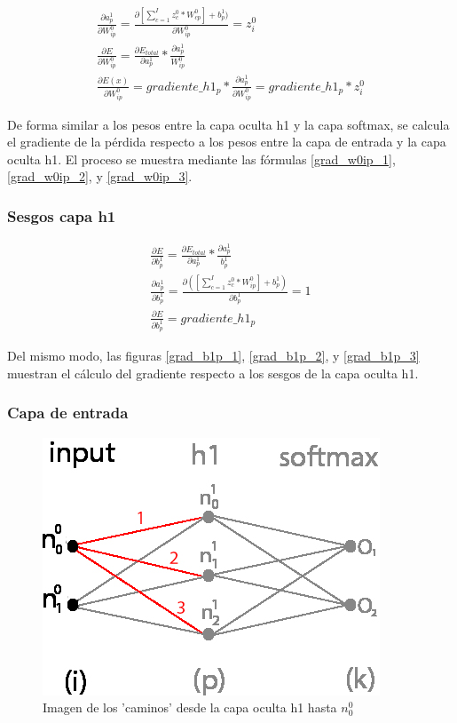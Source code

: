 \begin{gather}
	\frac{\partial a^1_p }{\partial W^0_{ip} } = \frac{\partial [\sum_{c=1}^{I} z^0_c * W^0_{cp}] + b^1_p)}{\partial W^0_{ip} } = z^0_i \label{grad_w0ip_1} \\
	\frac{\partial E}{\partial W^0_{ip}} = \frac{\partial E_{total} }{\partial a^1_p } * \frac{\partial a^1_p}{W^0_{ip}} \label{grad_w0ip_2} \\
	\frac{\partial E(x) }{\partial W^0_{ip} } = gradiente\_h1_p * \frac{\partial a^1_p }{\partial W^0_{ip} } = gradiente\_h1_p * z^0_i 
	\label{grad_w0ip_3}
\end{gather}

De forma similar a los pesos entre la capa oculta h1 y la capa softmax, se calcula el gradiente de la pérdida respecto a los pesos entre la capa de entrada y la capa oculta h1. El proceso se muestra mediante las fórmulas \ref{grad_w0ip_1}, \ref{grad_w0ip_2}, y \ref{grad_w0ip_3}.

\subsubsection{Sesgos capa h1}

\begin{gather}
	\frac{\partial E}{\partial b^1_p} = \frac{\partial E_{total} }{\partial a^1_p } * \frac{\partial a^1_p}{b^1_p} \label{grad_b1p_1} \\
	\frac{\partial a^1_p }{\partial b^1_p } = \frac{\partial ([\sum_{c=1}^{I} z^0_c * W^0_{ip}] + b^1_p) }{\partial b^1_p } = 1 \label{grad_b1p_2} \\
	\frac{\partial E}{\partial b^1_p} = gradiente\_h1_p
	\label{grad_b1p_3}
\end{gather}

Del mismo modo, las figuras \ref{grad_b1p_1}, \ref{grad_b1p_2}, y \ref{grad_b1p_3} muestran el cálculo del gradiente respecto a los sesgos de la capa oculta h1.

\subsubsection{Capa de entrada}

\begin{figure}[H]
	\centering
	\includegraphics[scale=0.35]{imagenes/nn_caminos_posibles_input.jpg}  
	\caption{Imagen de los 'caminos' desde la capa oculta h1 hasta $n^0_0$}
	\label{nn_caminos_posibles_input}
\end{figure}

